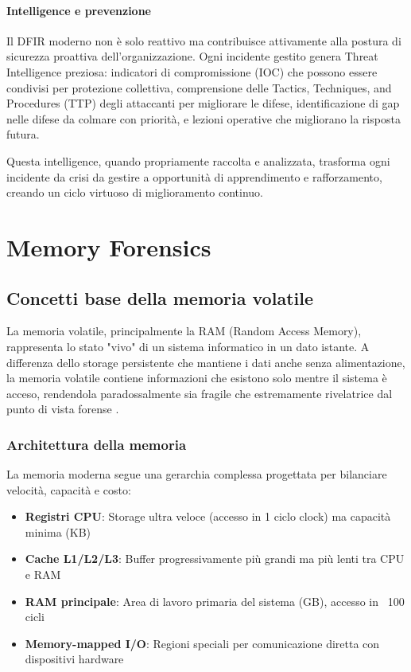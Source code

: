 \paragraph{Intelligence e prevenzione}
Il DFIR moderno non è solo reattivo ma contribuisce attivamente alla postura di sicurezza proattiva dell'organizzazione. Ogni incidente gestito genera Threat Intelligence preziosa: indicatori di compromissione (IOC) che possono essere condivisi per protezione collettiva, comprensione delle Tactics, Techniques, and Procedures (TTP) degli attaccanti per migliorare le difese, identificazione di gap nelle difese da colmare con priorità, e lezioni operative che migliorano la risposta futura.

Questa intelligence, quando propriamente raccolta e analizzata, trasforma ogni incidente da crisi da gestire a opportunità di apprendimento e rafforzamento, creando un ciclo virtuoso di miglioramento continuo.

\section{Memory Forensics}

\subsection{Concetti base della memoria volatile}

La memoria volatile, principalmente la RAM (Random Access Memory), rappresenta lo stato "vivo" di un sistema informatico in un dato istante. A differenza dello storage persistente che mantiene i dati anche senza alimentazione, la memoria volatile contiene informazioni che esistono solo mentre il sistema è acceso, rendendola paradossalmente sia fragile che estremamente rivelatrice dal punto di vista forense \cite{ligh2014}.

\subsubsection{Architettura della memoria}
La memoria moderna segue una gerarchia complessa progettata per bilanciare velocità, capacità e costo:

\begin{itemize}
    \item \textbf{Registri CPU}: Storage ultra veloce (accesso in 1 ciclo clock) ma capacità minima (KB)
    \item \textbf{Cache L1/L2/L3}: Buffer progressivamente più grandi ma più lenti tra CPU e RAM
    \item \textbf{RAM principale}: Area di lavoro primaria del sistema (GB), accesso in ~100 cicli
    \item \textbf{Memory-mapped I/O}: Regioni speciali per comunicazione diretta con dispositivi hardware
\end{itemize}

